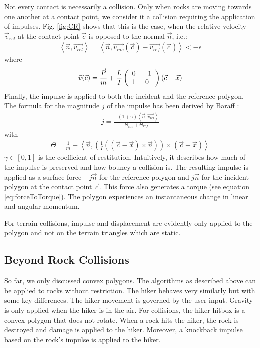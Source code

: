 Not every contact is necessarily a collision.
Only when rocks are moving towards one another at a contact point, we consider it a collision requiring the application of impulses.
Fig. \ref{fig:CR} shows that this is the case, when the relative velocity $\vec{v}_{rel}$ at the contact point $\vec{c}$ is opposed to the normal $\vec{n}$, i.e.:
\begin{align}
  \left<\vec{n},\vec{v_{rel}}\right> = \left<\vec{n},\vec{v_{inc}}(\vec{c})-\vec{v_{ref}}(\vec{c})\right> < -\epsilon\label{eq:vrel}
\end{align}
where
\begin{align}
  \vec{v}(\vec{c}) = \frac{\vec{P}}{m} + \frac{L}{I}
  \left(\begin{array}{c c}
    0 & -1\\
    1 & 0
  \end{array}\right)
  (\vec{c} - \vec{x})
\end{align}
Finally, the impulse is applied to both the incident and the reference polygon.
The formula for the magnitude $j$ of the impulse has been derived by Baraff \cite{baraff}:
\begin{align}
  j = \frac{-(1 + \gamma)\left<\vec{n},\vec{v_{rel}}\right>}{\Theta_{inc} + \Theta_{ref}}\label{eq:scary}
\end{align}
with 
\begin{align}
  \Theta = \frac{1}{m} + \left<\vec{n},\left(\frac{1}{I}((\vec{c} - \vec{x})\times \vec{n})\right)\times (\vec{c} - \vec{x})\right>
\end{align}
$\gamma \in [0, 1]$ is the coefficient of restitution.
Intuitively, it describes how much of the impulse is preserved and how \glqq bouncy\grqq{} a collision is.
The resulting impulse is applied as a surface force $-j\vec{n}$ for the reference polygon and $j\vec{n}$ for the incident polygon at the contact point $\vec{c}$.
This force also generates a torque (see equation \ref{eq:forceToTorque}).
The polygon experiences an instantaneous change in linear and angular momentum.

For terrain collisions, impulse and displacement are evidently only applied to the polygon and not on the terrain triangles which are static.

\subsection{Beyond Rock Collisions}

So far, we only discussed convex polygons.
The algorithms as described above can be applied to rocks without restriction.
The hiker behaves very similarly but with some key differences.
The hiker movement is governed by the user input.
Gravity is only applied when the hiker is in the air. 
For collisions, the hiker hitbox is a convex polygon that does not rotate.
When a rock hits the hiker, the rock is destroyed and damage is applied to the hiker.
Moreover, a knockback impulse based on the rock's impulse is applied to the hiker.

